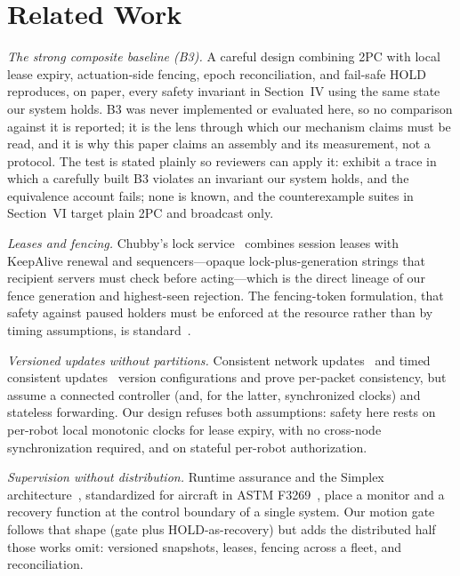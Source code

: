 \documentclass[10pt,journal]{IEEEtran}
\begin{document}
\section{Related Work}
\label{sec:related}

\emph{The strong composite baseline (B3).} A careful design combining
2PC with local lease expiry, actuation-side fencing, epoch
reconciliation, and fail-safe HOLD reproduces, on paper, every safety
invariant in Section~IV using the same state our system holds. B3 was
never implemented or evaluated here, so no comparison against it is
reported; it is the lens through which our mechanism claims must be
read, and it is why this paper claims an assembly and its
measurement, not a protocol. The test is stated plainly so reviewers
can apply it: exhibit a trace in which a carefully built B3 violates
an invariant our system holds, and the equivalence account fails;
none is known, and the counterexample suites in Section~VI target
plain 2PC and broadcast only.

\emph{Leases and fencing.} Chubby's lock service~\cite{burrows2006chubby}
combines session leases with KeepAlive renewal and sequencers---opaque
lock-plus-generation strings that recipient servers must check before
acting---which is the direct lineage of our fence generation and
highest-seen rejection. The fencing-token formulation, that safety
against paused holders must be enforced at the resource rather than
by timing assumptions, is standard~\cite{kleppmann2016locking}.

\emph{Versioned updates without partitions.} Consistent network
updates~\cite{reitblatt2012abstractions} and timed consistent
updates~\cite{mizrahi2015timed} version configurations and prove
per-packet consistency, but assume a connected controller (and, for
the latter, synchronized clocks) and stateless forwarding. Our design
refuses both assumptions: safety here rests on per-robot local
monotonic clocks for lease expiry, with no cross-node synchronization
required, and on stateful per-robot authorization.

\emph{Supervision without distribution.} Runtime assurance and the
Simplex architecture~\cite{seto1998simplex,sha2001simplicity},
standardized for aircraft in ASTM F3269~\cite{astmF3269}, place a
monitor and a recovery function at the control boundary of a single
system. Our motion gate follows that shape (gate plus HOLD-as-recovery)
but adds the distributed half those works omit: versioned snapshots,
leases, fencing across a fleet, and reconciliation.
\end{document}
